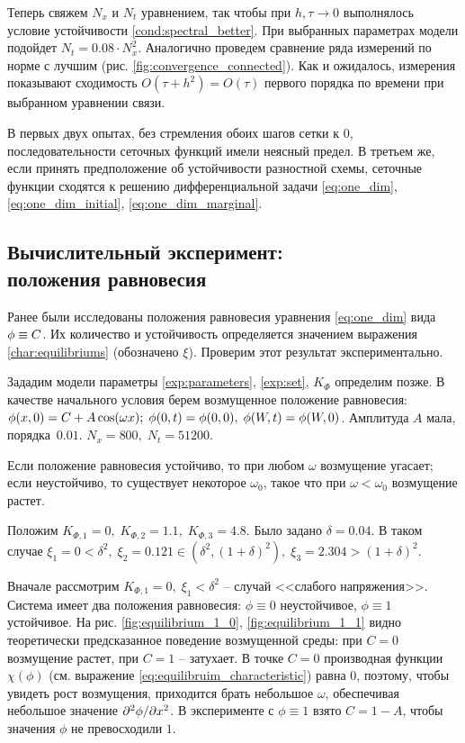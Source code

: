 Теперь свяжем $N_x$ и $N_t$ уравнением, так чтобы при $h, \tau \to 0$ выполнялось условие устойчивости \eqref{cond:spectral_better}. При выбранных параметрах модели подойдет $N_t = 0.08 \cdot N_x^2$. Аналогично проведем сравнение ряда измерений по норме с лучшим (рис. \ref{fig:convergence_connected}). Как и ожидалось, измерения показывают сходимость $O(\tau + h^2) = O(\tau)$ первого порядка по времени при выбранном уравнении связи.

В первых двух опытах, без стремления обоих шагов сетки к $0$, последовательности сеточных функций имели неясный предел. В третьем же, если принять предположение об устойчивости разностной схемы, сеточные функции сходятся к решению дифференциальной задачи \eqref{eq:one_dim}, \eqref{eq:one_dim_initial}, \eqref{eq:one_dim_marginal}.


\subsection{Вычислительный эксперимент: \\ положения равновесия}

Ранее были исследованы положения равновесия уравнения \eqref{eq:one_dim} вида $\phi \hm \equiv C$. Их количество и устойчивость определяется значением выражения \eqref{char:equilibriums} (обозначено $\xi$). Проверим этот результат экспериментально.

Зададим модели параметры \eqref{exp:parameters}, \eqref{exp:set}, $K_\Phi$ определим позже. В качестве начального условия берем возмущенное положение равновесия: $\phi(x, 0) = C \hm + A \cos(\omega x); \; \phi(0, t) = \phi(0, 0), \; \phi(W, t) = \phi(W, 0)$. Амплитуда $A$ мала, порядка~$0.01$. $N_x = 800, \; N_t = 51200$.

Если положение равновесия устойчиво, то при любом $\omega$ возмущение угасает; если неустойчиво, то существует некоторое $\omega_0$, такое что при $\omega < \omega_0$ возмущение растет.

Положим $K_{\Phi, 1} = 0, \; K_{\Phi, 2} = 1.1, \; K_{\Phi, 3} = 4.8$. Было задано $\delta = 0.04$. В таком случае $\xi_1 = 0 < \delta^2, \; \xi_2 = 0.121 \in (\delta^2, (1 + \delta)^2), \; \xi_3 = 2.304 > (1 + \delta)^2$.

Вначале рассмотрим $K_{\Phi, 1} = 0, \; \xi_1 < \delta^2$ -- случай <<слабого напряжения>>. Система имеет два положения равновесия: $\phi \equiv 0$ неустойчивое, $\phi \equiv 1$ устойчивое. На рис. \ref{fig:equilibrium_1_0}, \ref{fig:equilibrium_1_1} видно теоретически предсказанное поведение возмущенной среды: при $C = 0$ возмущение растет, при $C = 1$ -- затухает. В точке $C = 0$ производная функции $\chi(\phi)$ (см. выражение \eqref{eq:equilibruim_characteristic}) равна $0$, поэтому, чтобы увидеть рост возмущения, приходится брать небольшое $\omega$, обеспечивая небольшое значение $\partial^2 \phi / \partial x^2$. В эксперименте с $\phi \equiv 1$ взято $C = 1 - A$, чтобы значения $\phi$ не превосходили $1$.


